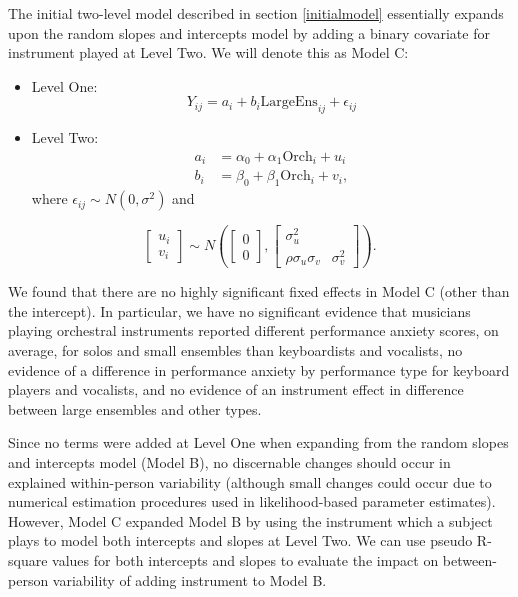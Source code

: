 \documentclass[
]{krantz}
\begin{document}
The initial two-level model described in section \ref{initialmodel} essentially expands upon the random slopes and intercepts model by adding a binary covariate for instrument played at Level Two. We will denote this as Model C:

\begin{itemize}
\item
  Level One:
  \begin{equation*}
  Y_{ij} = a_{i}+b_{i}\textrm{LargeEns}_{ij}+\epsilon_{ij}
  \end{equation*}
\item
  Level Two:
  \begin{align*}
  a_{i} & = \alpha_{0}+\alpha_{1}\textrm{Orch}_{i}+u_{i} \\
  b_{i} & = \beta_{0}+\beta_{1}\textrm{Orch}_{i}+v_{i},
  \end{align*}
  where \(\epsilon_{ij}\sim N(0,\sigma^2)\) and
\end{itemize}

\[ \left[ \begin{array}{c}
            u_{i} \\ v_{i}
          \end{array}  \right] \sim N \left( \left[
          \begin{array}{c}
            0 \\ 0
          \end{array} \right], \left[
          \begin{array}{cc}
            \sigma_{u}^{2} & \\
            \rho\sigma_{u}\sigma_{v} & \sigma_{v}^{2}
          \end{array} \right] \right). \]

We found that there are no highly significant fixed effects in Model C (other than the intercept). In particular, we have no significant evidence that musicians playing orchestral instruments reported different performance anxiety scores, on average, for solos and small ensembles than keyboardists and vocalists, no evidence of a difference in performance anxiety by performance type for keyboard players and vocalists, and no evidence of an instrument effect in difference between large ensembles and other types.

Since no terms were added at Level One when expanding from the random slopes and intercepts model (Model B), no discernable changes should occur in explained within-person variability (although small changes could occur due to numerical estimation procedures used in likelihood-based parameter estimates). However, Model C expanded Model B by using the instrument which a subject plays to model both intercepts and slopes at Level Two. We can use pseudo R-square values for both intercepts and slopes to evaluate the impact on between-person variability of adding instrument to Model B.
\end{document}
